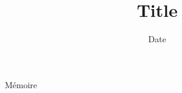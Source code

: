 \documentclass[12pt]{src/umons/memoire-umons}
\date{Date}
\title{Title}
\begin{document}
Mémoire
\end{document}
